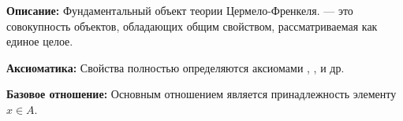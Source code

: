 

\hypertarget{term-set}{}
\hypertarget{term-set}{}
\begin{object} %



\textbf{Описание:}
Фундаментальный объект теории  Цермело-Френкеля.  — это совокупность объектов, обладающих общим свойством, рассматриваемая как единое целое.

\textbf{Аксиоматика:}
Свойства  полностью определяются аксиомами , ,  и др.

\textbf{Базовое отношение:}
Основным отношением является принадлежность элементу $x \in A$.
\end{object}